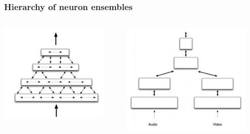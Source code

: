\documentclass[default]{beamer}
\begin{document}
	\begin{frame}
		\frametitle{Hierarchy of neuron ensembles}
		
		\begin{columns}
			\begin{column}{0.5\textwidth}
				\includegraphics[width=0.9\textwidth]{mpf/hierarchy}
			\end{column}
			\begin{column}{0.5\textwidth}
				\includegraphics[width=0.9\textwidth]{mpf/hierarchy_conv}
			\end{column}
		\end{columns}
		
	\end{frame}
	
\end{document}

